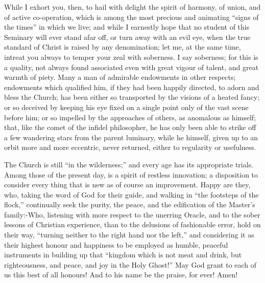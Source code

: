 \documentclass[
]{book}
\begin{document}
While I exhort you, then, to hail with delight the spirit of harmony, of union, and of active co-operation, which is among the most precious and animating ``signs of the times'' in which we live; and while I earnestly hope that no student of this Seminary will ever stand afar off, or turn away with an evil eye, when the true standard of Christ is raised by any denomination; let me, at the same time, intreat you always to temper your zeal with soberness. I say soberness; for this is a quality, not always found associated even with great vigour of talent, and great warmth of piety. Many a man of admirable endowments in other respects; endowments which qualified him, if they had been happily directed, to adorn and bless the Church; has been either so transported by the visions of a heated fancy; or so deceived by keeping his eye fixed on a single point only of the vast scene before him; or so impelled by the approaches of others, as anomalous as himself; that, like the comet of the infidel philosopher, he has only been able to strike off a few wandering stars from the parent luminary, while he himself, given up to an orbit more and more eccentric, never returned, either to regularity or usefulness.

The Church is still ``in the wilderness;'' and every age has its appropriate trials. Among those of the present day, is a spirit of restless innovation; a disposition to consider every thing that is new as of course an improvement. Happy are they, who, taking the word of God for their guide, and walking in ``the footsteps of the flock,'' continually seek the purity, the peace, and the edification of the Master's family:-Who, listening with more respect to the unerring Oracle, and to the sober lessons of Christian experience, than to the delusions of fashionable error, hold on their way, ``turning neither to the right hand nor the left,'' and considering it as their highest honour and happiness to be employed as humble, peaceful instruments in building up that ``kingdom which is not meat and drink, but righteousness, and peace, and joy in the Holy Ghost!'' May God grant to each of us this best of all honours! And to his name be the praise, for ever! Amen!
\end{document}
